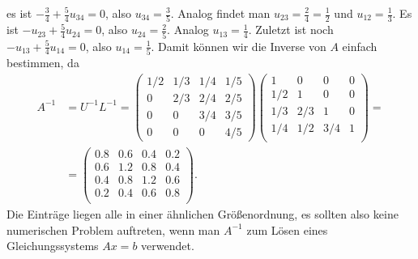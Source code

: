 \documentclass[english, parskip=full]{scrartcl}
\begin{document}
es ist $-\frac{3}{4} + \frac{5}{4} u_{34} = 0$, also $u_{34} = \frac{3}{5}$.
Analog findet man $u_{23} = \frac{2}{4} = \frac{1}{2}$ und $u_{12} = \frac{1}{3}$. 
Es ist $-u_{23} + \frac{5}{4} u_{24} = 0$, also $u_{24} = \frac{2}{5}$.
Analog $u_{13} = \frac{1}{4}$.
Zuletzt ist noch $-u_{13} + \frac{5}{4}u_{14} = 0$, also $u_{14} = \frac{1}{5}$.
Damit können wir die Inverse von $A$ einfach bestimmen, da
\begin{align}
A^{-1} &= U^{-1}L^{-1} = \begin{pmatrix}
1/2 & 1/3 & 1/4 & 1/5 \\
0 & 2/3 & 2/4 & 2/5 \\
0 & 0 & 3/4 & 3/5  \\
0 & 0 & 0 & 4/5
\end{pmatrix}\begin{pmatrix}
1 & 0 & 0 & 0 \\
1/2 & 1 & 0 & 0 \\
1/3 & 2/3 & 1 & 0 \\
1/4 & 1/2 & 3/4 & 1 \\
\end{pmatrix} = \\
&= \begin{pmatrix}
0.8 & 0.6 & 0.4 & 0.2 \\
0.6 & 1.2 & 0.8 & 0.4 \\
0.4 & 0.8 & 1.2 & 0.6 \\
0.2 & 0.4 & 0.6 & 0.8 \\
\end{pmatrix}.
\end{align}
Die Einträge liegen alle in einer ähnlichen Größenordnung, es sollten also keine numerischen Problem auftreten, wenn man $A^{-1}$ zum Lösen eines Gleichungssystems $Ax=b$ verwendet.



\end{document}

